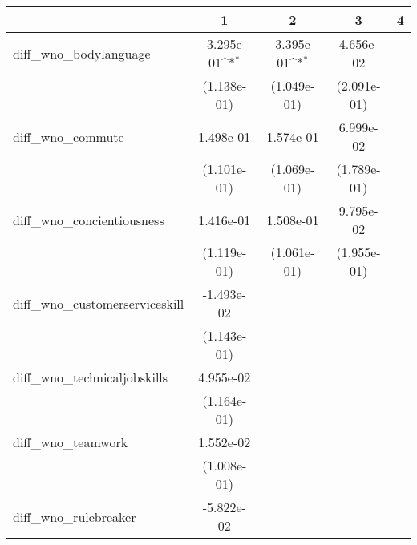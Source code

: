 {
\def\sym#1{\ifmmode^{#1}\else\(^{#1}\)\fi}
\begin{tabular}{l*{4}{c}}
    \toprule
                                      & \multicolumn{1}{c}{1} & \multicolumn{1}{c}{2} & \multicolumn{1}{c}{3} & \multicolumn{1}{c}{4} \\
    \midrule
    diff\_wno\_bodylanguage           & -3.295e-01\sym{*}     & -3.395e-01\sym{*}     & 4.656e-02             &                       \\
                                      & (1.138e-01)           & (1.049e-01)           & (2.091e-01)           &                       \\
    \addlinespace
    diff\_wno\_commute                & 1.498e-01             & 1.574e-01             & 6.999e-02             &                       \\
                                      & (1.101e-01)           & (1.069e-01)           & (1.789e-01)           &                       \\
    \addlinespace
    diff\_wno\_concientiousness       & 1.416e-01             & 1.508e-01             & 9.795e-02             &                       \\
                                      & (1.119e-01)           & (1.061e-01)           & (1.955e-01)           &                       \\
    \addlinespace
    diff\_wno\_customerserviceskill   & -1.493e-02            &                       &                       &                       \\
                                      & (1.143e-01)           &                       &                       &                       \\
    \addlinespace
    diff\_wno\_technicaljobskills     & 4.955e-02             &                       &                       &                       \\
                                      & (1.164e-01)           &                       &                       &                       \\
    \addlinespace
    diff\_wno\_teamwork               & 1.552e-02             &                       &                       &                       \\
                                      & (1.008e-01)           &                       &                       &                       \\
    \addlinespace
    diff\_wno\_rulebreaker            & -5.822e-02            &                       &                       &                       \\

\end{tabular}}
